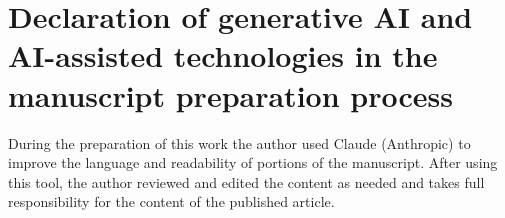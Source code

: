 \documentclass[a4paper,fleqn]{cas-dc}
\begin{document}
\section*{Declaration of generative AI and AI-assisted technologies in the manuscript preparation process}
During the preparation of this work the author used Claude (Anthropic) to improve
the language and readability of portions of the manuscript. After using this tool,
the author reviewed and edited the content as needed and takes full responsibility
for the content of the published article.



\end{document}
